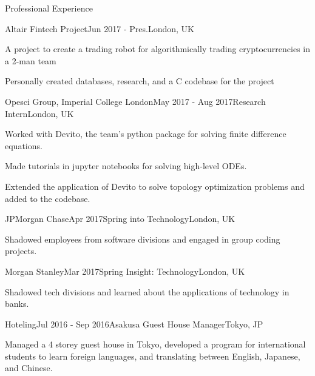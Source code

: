 \documentclass{resume} %
\begin{document}
\begin{rSection}{Professional Experience}

\begin{rSubsection}{Altair Fintech Project}{Jun 2017 - Pres.}{}{London, UK}
    \item A project to create a trading robot for algorithmically trading cryptocurrencies in a 2-man team
    \item Personally created databases, research, and a C codebase for the project
\end{rSubsection}


\begin{rSubsection}{Opesci Group, Imperial College London}{May 2017 - Aug 2017}{Research Intern}{London, UK}
    \item Worked with Devito, the team's python package for solving finite difference equations.
    \item Made tutorials in jupyter notebooks for solving high-level ODEs.
    \item Extended the application of Devito to solve topology optimization problems and added to the codebase.
\end{rSubsection}


\begin{rSubsection}{JPMorgan Chase}{Apr 2017}{Spring into Technology}{London, UK}
    \item Shadowed employees from software divisions and engaged in group coding projects.
\end{rSubsection}


\begin{rSubsection}{Morgan Stanley}{Mar 2017}{Spring Insight: Technology}{London, UK}
    \item Shadowed tech divisions and learned about the applications of technology in banks.
\end{rSubsection}


\begin{rSubsection}{Hoteling}{Jul 2016 - Sep 2016}{Asakusa Guest House Manager}{Tokyo, JP}
    \item Managed a 4 storey guest house in Tokyo, developed a program for international students to learn foreign languages, and translating between English, Japanese, and Chinese.
\end{rSubsection}


\end{rSection}
\end{document}

